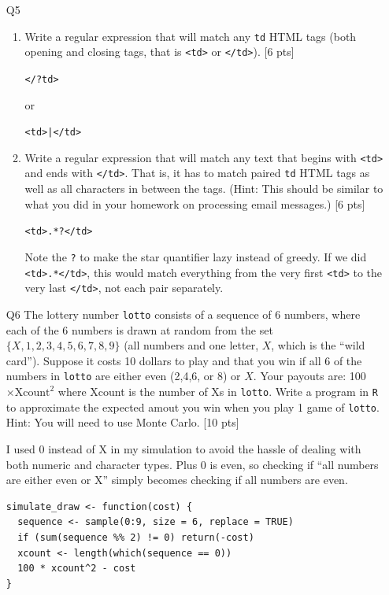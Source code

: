 \documentclass[12pt]{article}
\theoremstyle{Conjecture}
\theoremstyle{example}
\theoremstyle{remark}
\theoremstyle{lemma}
\theoremstyle{definition}
\theoremstyle{corol}
\theoremstyle{proposition}
\theoremstyle{condition}
\begin{document}
\begin{enumerate}
\item [Q5]
\begin{enumerate}
  \item Write a regular expression that will match any \texttt{td} HTML tags (both opening and closing tags, that is \texttt{<td>} or \texttt{</td>}). [6 pts]
  {\color{blue}
  \begin{center}
  	\texttt{</?td>}
  \end{center}
  or
  \begin{center}
  	\texttt{<td>|</td>}
  \end{center}
  }
  \vspace{0.5in}
  \item Write a regular expression that will match any text that begins with \texttt{<td>} and ends with \texttt{</td>}. That is, it has to match paired \texttt{td} HTML tags as well as all characters in between the tags. (Hint: This should be similar to what you did in your homework on processing email messages.) [6 pts]
  {\color{blue}
  \begin{center}
  	\texttt{<td>.*?</td>}
  \end{center}
  Note the \texttt{?} to make the star quantifier lazy instead of greedy. If we did \texttt{<td>.*</td>}, this would match everything from the very first \texttt{<td>} to the very last \texttt{</td>}, not each pair separately.
  }
\end{enumerate}
\newpage 

\item [Q6] The lottery number {\tt lotto} consists of a sequence of 6
  numbers, where each of the 6 numbers is drawn at random from the set
  $\{X, 1,2,3,4,5,6,7,8,9\}$ (all numbers and one letter, $X$, which
  is the ``wild card''). Suppose it costs 10 dollars to play and that
  you win if all 6 of the numbers in {\tt lotto} are either even
  (2,4,6, or 8) or $X$. Your payouts are: 100$\times\mbox{Xcount}^2$
  where Xcount is the number of Xs in {\tt lotto}. Write a program in
  {\tt R} to approximate the expected amout you win when you play 1
  game of {\tt lotto}.  Hint: You will need to use Monte Carlo. [10 pts]

{\color{blue}
I used 0 instead of X in my simulation to avoid the hassle of dealing with both numeric and character types. Plus 0 is even, so checking if ``all numbers are either even or X'' simply becomes checking if all numbers are even.
\begin{verbatim}
simulate_draw <- function(cost) {
  sequence <- sample(0:9, size = 6, replace = TRUE)
  if (sum(sequence %% 2) != 0) return(-cost)
  xcount <- length(which(sequence == 0))
  100 * xcount^2 - cost
}


\end{verbatim}}
\end{enumerate}
\end{document}
